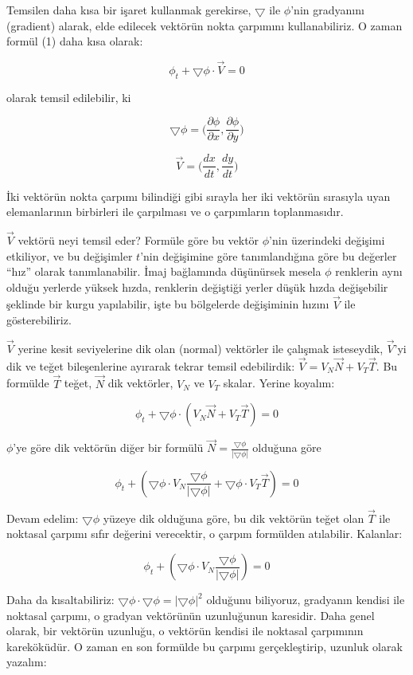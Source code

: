 \documentclass[12pt,fleqn]{article}\usepackage{../../common}
\begin{document}
Temsilen daha kısa bir işaret kullanmak gerekirse, $\bigtriangledown$
ile $\phi$'nin gradyanını (gradient) alarak, elde edilecek vektörün
nokta çarpımını kullanabiliriz.  O zaman formül (1) daha kısa
olarak:

$$ \phi_t + \bigtriangledown \phi \cdot \vec{V} = 0 $$

olarak temsil edilebilir, ki

$$ \bigtriangledown \phi = \bigg(
\frac{\partial \phi}{\partial x},
\frac{\partial \phi}{\partial y} \bigg)
 $$

$$ \vec{V} = \bigg(
\frac{dx}{dt} ,
\frac{dy}{dt} \bigg)
 $$

İki vektörün nokta çarpımı bilindiği gibi sırayla her iki vektörün
sırasıyla uyan elemanlarının birbirleri ile çarpılması ve o
çarpımların toplanmasıdır.

$\vec{V}$ vektörü neyi temsil eder? Formüle göre bu vektör $\phi$'nin
üzerindeki değişimi etkiliyor, ve bu değişimler $t$'nin değişimine
göre tanımlandığına göre bu değerler ``hız'' olarak
tanımlanabilir. İmaj bağlamında düşünürsek mesela $\phi$ renklerin
aynı olduğu yerlerde yüksek hızda, renklerin değiştiği yerler düşük
hızda değişebilir şeklinde bir kurgu yapılabilir, işte bu bölgelerde
değişiminin hızını $\vec{V}$ ile gösterebiliriz.

$\vec{V}$ yerine kesit seviyelerine dik olan (normal) vektörler ile çalışmak
isteseydik, $\vec{V}$'yi dik ve teğet bileşenlerine ayırarak tekrar temsil
edebilirdik: $\vec{V} = V_N\vec{N} + V_T\vec{T}$. Bu formülde $\vec{T}$ teğet,
$\vec{N}$ dik vektörler, $V_N$ ve $V_T$ skalar. Yerine koyalım:

$$ \phi_t + \bigtriangledown \phi \cdot (V_N\vec{N} + V_T\vec{T}) = 0 $$

$\phi$'ye göre dik vektörün diğer bir formülü $\vec{N} =
\frac{\bigtriangledown\phi}{|\bigtriangledown\phi|}$ olduğuna göre

$$ \phi_t + (\bigtriangledown \phi \cdot
V_N\frac{\bigtriangledown\phi}{|\bigtriangledown\phi|} + \bigtriangledown
\phi \cdot V_T\vec{T}) = 0 $$

Devam edelim: $\bigtriangledown \phi$ yüzeye dik olduğuna göre, bu dik vektörün
teğet olan $\vec{T}$ ile noktasal çarpımı sıfır değerini verecektir, o çarpım
formülden atılabilir. Kalanlar:

$$ \phi_t + (\bigtriangledown \phi \cdot 
V_N\frac{\bigtriangledown\phi}{|\bigtriangledown\phi|}) = 0 $$

Daha da kısaltabiliriz: $\bigtriangledown \phi \cdot \bigtriangledown \phi
= |\bigtriangledown \phi|^2$ olduğunu biliyoruz, gradyanın kendisi ile
noktasal çarpımı, o gradyan vektörünün uzunluğunun karesidir. Daha genel
olarak, bir vektörün uzunluğu, o vektörün kendisi ile noktasal çarpımının
kareköküdür. O zaman en son formülde bu çarpımı gerçekleştirip, uzunluk
olarak yazalım:
\end{document}
